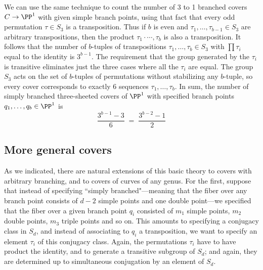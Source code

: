 We can use the same technique to count the number of 3 to 1 branched covers $C \to \PP^1$ with given simple branch points, using that fact that every odd permutation $\tau \in S_3$ is a transposition. Thus if $b$ is even and  $\tau_1,\dots,\tau_{b-1} \in S_3$ are arbitrary transpositions, then the product 
$\tau_1\cdot \cdots,\tau_{b}$ is also a
 transposition. It follows that the number of $b$-tuples of transpositions $\tau_1,\dots,\tau_{b} \in S_3$ with $\prod \tau_i$ equal to the identity is $3^{b-1}$. The requirement that the group generated by the $\tau_i$ is transitive eliminates just the three cases where all the $\tau_i$ are equal. The group $S_3$ acts on the set of $b$-tuples of permutations without stabilizing any $b$-tuple, so every cover corresponds to exactly 6 sequences
  $\tau_1,\dots,\tau_b$. In sum, the number of simply branched three-sheeted covers of $\PP^1$ with specified branch points $q_1,\dots,q_b \in \PP^1$ is
$$
\frac{3^{b-1} - 3}{6} \; = \; \frac{3^{b-2} - 1}{2} 
$$


\subsection{More general covers}\label{general covers}

As we indicated, there are natural extensions of this basic theory to covers with arbitrary branching, and to covers of curves of any genus. For the first, suppose that instead of specifying ``simply branched"---meaning that the fiber over any branch point consists of $d-2$ simple points and one double point---we specified that the fiber over a given branch point $q_i$ consisted of $m_1$ simple points, $m_2$ double points, $m_3$ triple points and so on. This amounts to specifying a conjugacy class in $S_d$, and instead of associating to $q_i$ a transposition, we want to specify an element $\tau_i$ of this conjugacy class. Again, the permutations $\tau_i$ have to have product the identity, and to generate a transitive subgroup of $S_d$; and again, they are determined up to simultaneous conjugation by an element of $S_d$.


